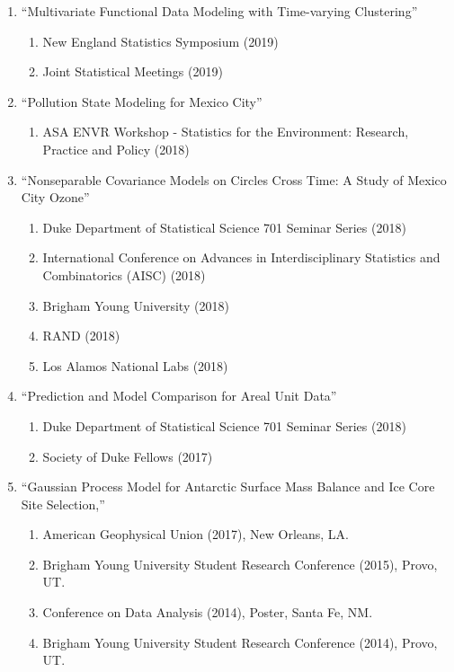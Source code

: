 \documentclass[12pt]{article}
\begin{document}
\begin{enumerate}[label=$\bullet$]
\item ``Multivariate Functional Data Modeling with Time-varying Clustering''
\begin{enumerate}[label=$\cdot$]
\item New England Statistics Symposium (2019)
\item Joint Statistical Meetings (2019)
\end{enumerate}
\item ``Pollution State Modeling for Mexico City''
\begin{enumerate}[label=$\cdot$]
\item ASA ENVR Workshop - Statistics for the Environment: Research, Practice and Policy (2018)
\end{enumerate}
\item ``Nonseparable Covariance Models on Circles Cross Time: A Study of Mexico City Ozone''
\begin{enumerate}[label=$\cdot$]
\item Duke Department of Statistical Science 701 Seminar Series (2018)
\item International Conference on Advances in Interdisciplinary Statistics and Combinatorics (AISC) (2018)
\item Brigham Young University (2018)
\item RAND (2018)
\item Los Alamos National Labs (2018)
\end{enumerate}
\item ``Prediction and Model Comparison for Areal Unit Data''
\begin{enumerate}[label=$\cdot$]
\item Duke Department of Statistical Science 701 Seminar Series (2018)
\item Society of Duke Fellows (2017)
\end{enumerate}
\item  ``Gaussian Process Model for Antarctic Surface Mass Balance and Ice Core Site Selection,'' 
\begin{enumerate}[label=$\cdot$]
\item American Geophysical Union (2017), New Orleans, LA.
\item Brigham Young University Student Research Conference (2015),  Provo, UT.
\item Conference on Data Analysis (2014), Poster, Santa Fe, NM.
\item Brigham Young University Student Research Conference (2014), Provo, UT.

\end{enumerate}
\end{enumerate}
\end{document}
